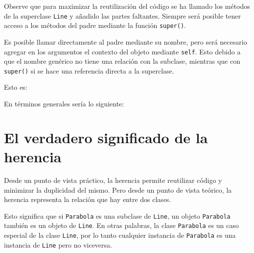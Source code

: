 Observe que para maximizar la reutilización del código se ha llamado los
métodos de la superclase \texttt{Line} y añadido las partes faltantes.
Siempre será posible tener acceso a los métodos del padre mediante la
función \texttt{super()}.

Es posible llamar directamente al padre mediante su nombre, pero será
necesario agregar en los argumentos el contexto del objeto mediante
\texttt{self}. Esto debido a que el nombre genérico no tiene una
relación con la subclase, mientras que con \texttt{super()} si se hace
una referencia directa a la superclase.

Esto es:

\begin{Shaded}
\begin{Highlighting}[]
\NormalTok{(}
\end{Highlighting}
\end{Shaded}

En términos generales sería lo siguiente:

\begin{Shaded}
\begin{Highlighting}[]
\end{Highlighting}
\end{Shaded}

\section{El verdadero significado de la herencia}

Desde un punto de vista práctico, la herencia permite reutilizar código
y minimizar la duplicidad del mismo. Pero desde un punto de vista
teórico, la herencia representa la relación que hay entre dos clases.

Esto significa que si \texttt{Parabola} es una subclase de
\texttt{Line}, un objeto \texttt{Parabola} también es un objeto de
\texttt{Line}. En otras palabras, la clase \texttt{Parabola} es un caso
especial de la clase \texttt{Line}, por lo tanto cualquier instancia de
\texttt{Parabola} es una instancia de \texttt{Line} pero no viceversa. \\

